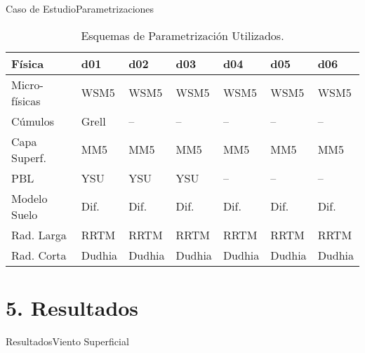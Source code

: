 \documentclass[mathserif]{beamer}
\begin{document}
\begin{frame}{Caso de Estudio}{Parametrizaciones}
\begin{table}[h!]
	\caption{Esquemas de Parametrización Utilizados.}\label{tab:esquemas}
	\centering
	{\footnotesize \begin{tabular}{lllllll}
		\toprule
		Física 					& d01	&	d02	&	d03	&	d04	&	d05	&	d06 \\
		\midrule
		Micro-físicas		 	& WSM5 & WSM5 & WSM5 &WSM5&WSM5&WSM5  \\
		Cúmulos			 		& Grell & -- & -- & -- & -- & -- \\ 
		Capa Superf.	 	& MM5 & MM5 & MM5 & MM5 & MM5 & MM5 \\
		PBL				 		& YSU & YSU & YSU & -- & -- & -- \\
		Modelo Suelo 		& Dif. & Dif. & Dif. & Dif. & Dif. & Dif. 	\\
		Rad. Larga	& RRTM &RRTM&RRTM&RRTM&RRTM&RRTM \\
		Rad. Corta	& Dudhia &Dudhia&Dudhia&Dudhia&Dudhia&Dudhia \\
		\bottomrule
	\end{tabular}}
\end{table}
\end{frame}

\section{5. Resultados}

\begin{frame}{Resultados}{Viento Superficial}
\vspace{-1cm}
\begin{center}
\end{center}
\end{frame}
\end{document}
